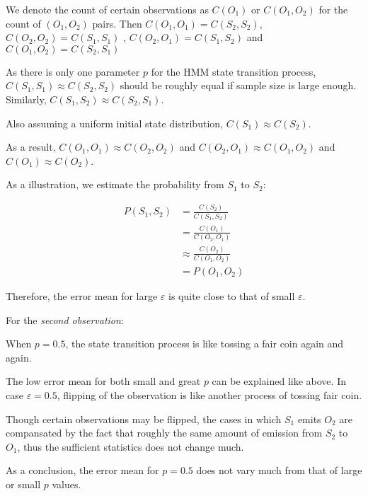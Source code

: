 \documentclass[paper=a4, fontsize=11pt]{scrartcl} %
\numberwithin{equation}{section} %
\numberwithin{figure}{section} %
\numberwithin{table}{section} %
\begin{document}
We denote the count of certain observations as $C (O_1)$ or $C (O_1, O_2)$ for the count of $(O_1, O_2)$ pairs. Then $C (O_1, O_1) = C (S_2, S_2)$, $C (O_2, O_2) = C (S_1, S_1)$ , $C (O_2, O_1) = C (S_1, S_2)$ and $C (O_1, O_2) = C (S_2, S_1)$ 

As there is only one parameter $p$ for the HMM state transition process, $C(S_1,S_1) \approx C(S_2,S_2)$ should be roughly equal if sample size is large enough. Similarly, $C(S_1, S_2) \approx C(S_2, S_1)$. 

Also assuming a uniform initial state distribution, $C (S_1) \approx C (S_2)$. \newline

As a result, $C (O_1, O_1) \approx C (O_2, O_2)$ and $C (O_2, O_1) \approx C (O_1, O_2)$ and $C (O_1) \approx C (O_2)$. 

As a illustration, we estimate the probability from $S_1$ to $S_2$:

\begin {align*}
  P (S_1, S_2) &= \frac {C (S_2)} {C (S_1, S_2)} \\
  &= \frac {C (O_1)} {C (O_2, O_1)} \\
  &\approx \frac {C (O_2)} {C (O_1, O_2)}\\
  &=P (O_1, O_2)
\end {align*}

Therefore, the error mean for large $\varepsilon$ is quite close to that of small $\varepsilon$.\newline

For the {\em second observation}:\newline

When $p=0.5$, the state transition process is like tossing a fair coin again and again.

The low error mean for both small and great $p$ can be explained like above. In case $\varepsilon=0.5$, flipping of the observation is like another process of tossing fair coin.

Though certain observations may be flipped, the cases in which $S_1$ emits $O_2$ are compansated by the fact that roughly the same amount of emission from $S_2$ to $O_1$, thus the sufficient statistics does not change much.

As a conclusion, the error mean for $p=0.5$ does not vary much from that of large or small $p$ values.

\end{document}
